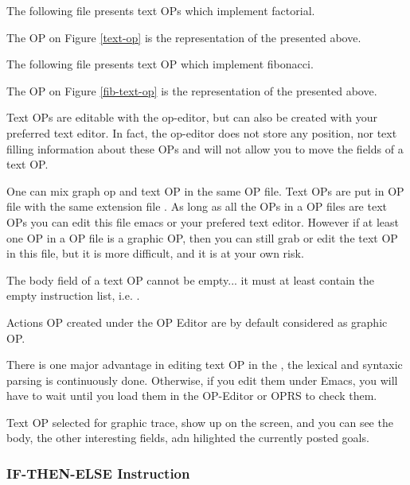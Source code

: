 The following file presents text OPs which implement factorial.



The OP on Figure \ref{text-op} is the \OPE{} representation of the  presented above.

The following file presents text OP which implement fibonacci.


The OP on Figure \ref{fib-text-op} is the \OPE{} representation of the
 presented above.

Text OPs  are editable with the op-editor, but can also be created with your
preferred text editor. In fact, the op-editor does not store any position, nor
text filling information about these OPs and will not allow you to move the
fields of a text OP. 

One can mix graph op and text OP in the same OP file. Text OPs are put in OP
file with  the same extension file . As long as all the OPs in a OP
files are text OPs you can edit this file emacs or your prefered text editor.
However if  at least one OP in a OP file is a graphic OP, then you can  still
grab or edit the text OP in this file, but it is more difficult, and it is at
your own risk.

The body field of a text OP cannot be empty... it must at least contain the
empty instruction list, i.e. \code{()}.

Actions OP created under the OP Editor are by default considered as graphic OP.

There is one major advantage in editing text OP in the \OPE{}, the lexical and
syntaxic parsing is continuously done.  Otherwise, if you edit them under
Emacs, you will have to wait until you load them in the OP-Editor or OPRS to
check them.

Text OP selected for graphic trace, show up on the screen, and you can see the
body, the other interesting fields, adn hilighted the currently posted goals.

\subsubsection{IF-THEN-ELSE Instruction}

